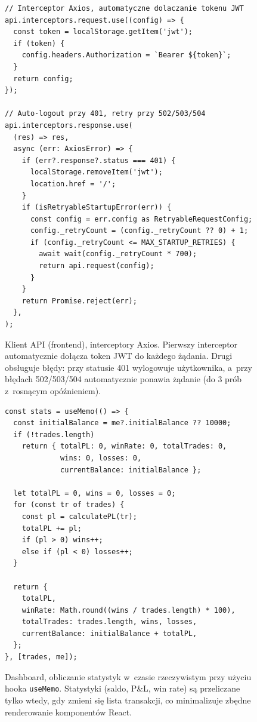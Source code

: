 \documentclass[12pt,a4paper]{article}
\begin{document}
\begin{figure}[H]
\begin{lstlisting}[style=typescript, caption={}, label={}]
// Interceptor Axios, automatyczne dolaczanie tokenu JWT
api.interceptors.request.use((config) => {
  const token = localStorage.getItem('jwt');
  if (token) {
    config.headers.Authorization = `Bearer ${token}`;
  }
  return config;
});

// Auto-logout przy 401, retry przy 502/503/504
api.interceptors.response.use(
  (res) => res,
  async (err: AxiosError) => {
    if (err?.response?.status === 401) {
      localStorage.removeItem('jwt');
      location.href = '/';
    }
    if (isRetryableStartupError(err)) {
      const config = err.config as RetryableRequestConfig;
      config._retryCount = (config._retryCount ?? 0) + 1;
      if (config._retryCount <= MAX_STARTUP_RETRIES) {
        await wait(config._retryCount * 700);
        return api.request(config);
      }
    }
    return Promise.reject(err);
  },
);
\end{lstlisting}
\caption{Klient API (frontend), interceptory Axios. Pierwszy interceptor automatycznie dołącza token JWT do każdego żądania. Drugi obsługuje błędy: przy statusie 401 wylogowuje użytkownika, a~przy błędach 502/503/504 automatycznie ponawia żądanie (do 3 prób z~rosnącym opóźnieniem).}
\label{fig:axios-interceptors}
\end{figure}

\begin{figure}[H]
\begin{lstlisting}[style=typescript, caption={}, label={}]
const stats = useMemo(() => {
  const initialBalance = me?.initialBalance ?? 10000;
  if (!trades.length)
    return { totalPL: 0, winRate: 0, totalTrades: 0,
             wins: 0, losses: 0,
             currentBalance: initialBalance };

  let totalPL = 0, wins = 0, losses = 0;
  for (const tr of trades) {
    const pl = calculatePL(tr);
    totalPL += pl;
    if (pl > 0) wins++;
    else if (pl < 0) losses++;
  }

  return {
    totalPL,
    winRate: Math.round((wins / trades.length) * 100),
    totalTrades: trades.length, wins, losses,
    currentBalance: initialBalance + totalPL,
  };
}, [trades, me]);
\end{lstlisting}
\caption{Dashboard, obliczanie statystyk w~czasie rzeczywistym przy użyciu hooka \texttt{useMemo}. Statystyki (saldo, P\&L, win rate) są przeliczane tylko wtedy, gdy zmieni się lista transakcji, co minimalizuje zbędne renderowanie komponentów React.}
\label{fig:dashboard-stats}
\end{figure}
\end{document}
